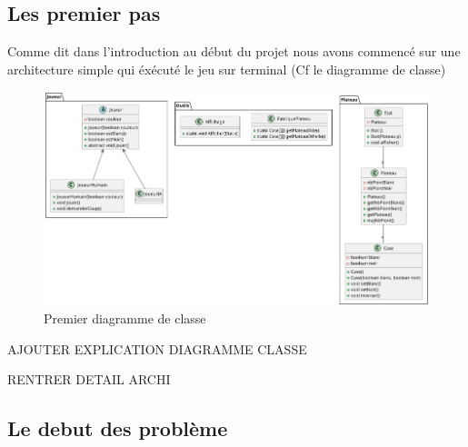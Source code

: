 \documentclass[12pt, legalpaper]{article}
\begin{document}
\subsection{Les premier pas}
Comme dit dans l'introduction au début du projet nous avons commencé sur une architecture simple 
qui éxécuté le jeu sur terminal (Cf le diagramme de classe)
\begin{figure}[h]
    \includegraphics[scale=0.55]{othello}
    \caption{Premier diagramme de classe}
\end{figure}


AJOUTER EXPLICATION DIAGRAMME CLASSE

RENTRER DETAIL ARCHI

\subsection{Le debut des problème}
\end{document}
